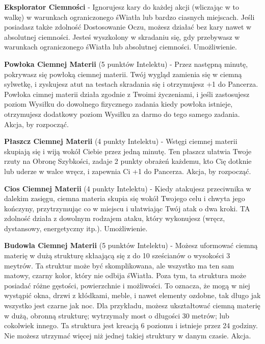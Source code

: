 {\textbf{Eksplorator Ciemności}\label{sec:Eksplorator Ciemności} - Ignorujesz kary do każdej akcji (wliczając w to walkę) w warunkach ograniczonego śWiatła lub bardzo ciasnych miejscach. Jeśli posiadasz także zdolność Dostosowanie Oczu, możesz działać bez kary nawet w absolutnej ciemności. Jesteś wyszkolony w skradaniu się, gdy przebywasz w warunkach ograniczonego śWiatła lub absolutnej ciemności. Umożliwienie. 

\textbf{Powłoka Ciemnej Materii}\label{sec:Powłoka Ciemnej Materii} (5 punktów Intelektu) - Przez następną minutę, pokrywasz się powłoką ciemnej materii. Twój wygląd zamienia się w ciemną sylwetkę, i zyskujesz atut na testach skradania się i otrzymujesz +1 do Pancerza. Powłoka cimnej materii działa zgodnie z Twoimi życzeniami, i jeśli zastosujesz poziom Wysiłku do dowolnego fizycznego zadania kiedy powłoka istnieje, otrzymujesz dodatkowy poziom Wysiłku za darmo do tego samego zadania. Akcja, by rozpocząć. 

\textbf{Płaszcz Ciemnej Materii}\label{sec:Płaszcz Ciemnej Materii} (4 punkty Intelektu) - Wstęgi ciemnej materii skupiają się i wiją wokół Ciebie przez jedną minutę. Ten płaszcz ułatwia Twoje rzuty na Obronę Szybkości, zadaje 2 punkty obrażeń każdemu, kto Cię dotknie lub uderze w walce wręcz, i zapewnia Ci +1 do Pancerza. Akcja, by rozpocząć. 

\textbf{Cios Ciemnej Materii}\label{sec:Cios Ciemnej Materii} (4 punkty Intelektu) - Kiedy atakujesz przeciwnika w dalekim zasięgu, ciemna materia skupia się wokół Twojego celu i chwyta jego kończyny, przytrzymując co w miejscu i ułatwiając Twój atak o dwa kroki. TA zdolność działa z dowolnym rodzajem ataku, który wykonujesz (wręcz, dystansowy, energetyczny itp.). Umożliwienie.

\textbf{Budowla Ciemnej Materii}\label{sec:Budowla Ciemnej Materii} (5 punktów Intelektu) - Możesz uformować ciemną materię w dużą strukturę skłaającą się z do 10 sześcianów o wysokości 3 meytrów. Ta struktur może być skomplikowana, ale wszystko ma ten sam matowy, czarny kolor, który nie odbija śWiatła. Poza tym, ta struktura może posiadać różne gęstości, powierzchnie i możliwości. To oznacza, że mogą w niej wystąpić okna, drzwi z kłódkami, meble, i nawet elementy ozdobne, tak długo jak wszystko jest czarne jak noc. Dla przykładu, możesz ukształtować ciemną materię w dużą, obronną strukturę; wytrzymały most o długości 30 metrów; lub cokolwiek innego. Ta struktura jest kreacją 6 poziomu i istnieje przez 24 godziny. Nie możesz utrzymać więcej niż jednej takiej struktury w danym czasie. Akcja. 

}
